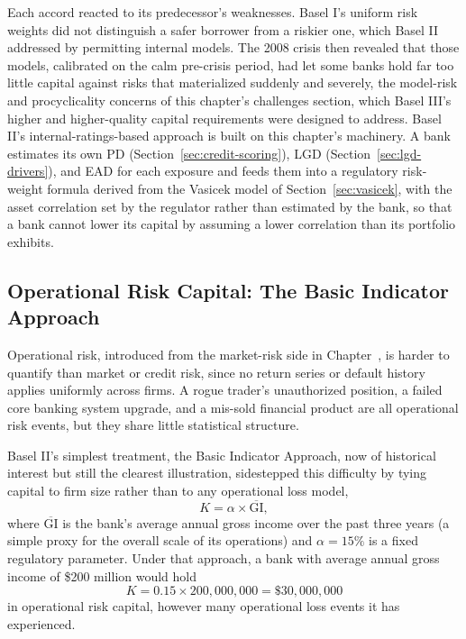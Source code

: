 \documentclass[../ai_in_finance]{subfiles}
\begin{document}
Each accord reacted to its predecessor's weaknesses. Basel I's uniform risk weights did not distinguish a safer borrower from a riskier one, which Basel II addressed by permitting internal models. The 2008 crisis then revealed that those models, calibrated on the calm pre-crisis period, had let some banks hold far too little capital against risks that materialized suddenly and severely, the model-risk and procyclicality concerns of this chapter's challenges section, which Basel III's higher and higher-quality capital requirements were designed to address.
Basel II's internal-ratings-based approach is built on this chapter's machinery. A bank estimates its own PD (Section~\ref{sec:credit-scoring}), LGD (Section~\ref{sec:lgd-drivers}), and EAD for each exposure and feeds them into a regulatory risk-weight formula derived from the Vasicek model of Section~\ref{sec:vasicek}, with the asset correlation set by the regulator rather than estimated by the bank, so that a bank cannot lower its capital by assuming a lower correlation than its portfolio exhibits.

\subsection{Operational Risk Capital: The Basic Indicator Approach}

Operational risk, introduced from the market-risk side in Chapter~, is harder to quantify than market or credit risk, since no return series or default history applies uniformly across firms. A rogue trader's unauthorized position, a failed core banking system upgrade, and a mis-sold financial product are all operational risk events, but they share little statistical structure.

Basel II's simplest treatment, the Basic Indicator Approach, now of historical interest but still the clearest illustration, sidestepped this difficulty by tying capital to firm size rather than to any operational loss model,
\begin{equation*}
K = \alpha \times \overline{\text{GI}},
\end{equation*}
where $\overline{\text{GI}}$ is the bank's average annual gross income over the past three years (a simple proxy for the overall scale of its operations) and $\alpha=15\%$ is a fixed regulatory parameter. Under that approach, a bank with average annual gross income of \$200 million would hold
\begin{equation*}
K = 0.15 \times 200{,}000{,}000 = \$30{,}000{,}000
\end{equation*}
in operational risk capital, however many operational loss events it has experienced.
\end{document}
